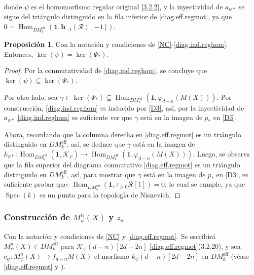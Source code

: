 \documentclass[10pt]{amsart}
\theoremstyle{definition}
\newtheorem{proposition}[definition]{Proposici\'on}
\theoremstyle{remark}
\theoremstyle{definition}
\begin{document}
donde $\psi$ es el homomorfismo regular original \ref{3.2.2}, y la inyectividad de $a_{\psi*}$ se sigue del triángulo distinguido en la fila inferior de \ref{diag.eff.regmot}, ya que $0=\operatorname{Hom}_{DM_{k}^{\mathrm{eff}}}(\mathbf{1},\mathbf{h}_{-1}( \mathcal{R})[-1])$.

\begin{proposition}\label{KER}
Con la notación y condiciones de \ref{NC}-\ref{diag.ind.reghom}. Entonces, $\ker(\psi)=\ker(\Psi_{*})$.
\end{proposition}

\begin{proof}
Por la conmutatividad de \ref{diag.ind.reghom}, se concluye que $\ker(\psi)\subseteq\ker(\Psi_{*})$.

Por otro lado, sea $\gamma\in\ker(\Psi_{*})\subseteq\operatorname{Hom}_{DM_{k}^{\mathrm{eff}}}( \mathbf{1},\varphi_{d-n}(M(X)))$. Por construcción, \ref{diag.ind.reghom} es inducido por \ref{D3}, así, por la inyectividad de $a_{\psi*}$ \ref{diag.ind.reghom} es suficiente ver que $\gamma$ está en la imagen de $p_{*}$ en \ref{D3}.

Ahora, recordando que la columna derecha en \ref{diag.eff.regmot} es un triángulo distinguido en $DM_{k}^{\mathrm{eff}}$, así, se deduce que $\gamma$ está en la imagen de $k_{\psi*}:\operatorname{Hom}_{DM_{k}^{\mathrm{eff}}}(\mathbf{1},\mathcal{K}_{\psi })\to\operatorname{Hom}_{DM_{k}^{\mathrm{eff}}}(\mathbf{1},\varphi_{d-n}(M(X)))$. Luego, se observa que la fila superior del diagrama conmutativo \ref{diag.eff.regmot} es un triángulo distinguido en $DM_{k}^{\mathrm{eff}}$, así, para mostrar que $\gamma$ está en la imagen de $p_{*}$ en  \ref{D3}, es suficiente probar que: $\operatorname{Hom}_{DM_{k}^{\mathrm{eff}}}(\mathbf{1},\tau_{\geq 0}\mathcal{R}[ 1])=0$, lo cual se cumple, ya que $\operatorname{Spec}(k)$ es un punto para la topología de Nisnevich.
\end{proof}

\subsubsection{Construcción de  $M^{n}_{\psi}(X)$ y $z_{\psi}$ }\label{CNC}

Con la notación y condiciones de \ref{NC} y \ref{diag.eff.regmot}. Se escribirá $M^{n}_{\psi}(X)\in DM_{k}^{\mathrm{eff}}$ para $\mathcal{K}_{\psi}(d-n)[2d-2n]$ \ref{diag.eff.regmot}(3.2.20), y sea $c_{\psi}:M^{n}_{\psi}(X)\to f_{d-n}M(X)$ el morfismo $k_{\psi}(d-n)[2d-2n]$ en $DM_{k}^{\mathrm{eff}}$ (véase \ref{diag.eff.regmot} y \cite[3.3.3(2)]{Pel17}).
\end{document}
